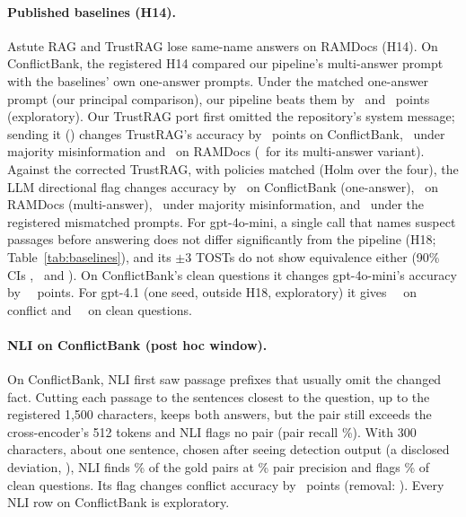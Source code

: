 \paragraph{Published baselines (H14).} Astute RAG \citep{wang2025astute} and TrustRAG \citep{zhou2025trustrag} lose same-name answers
on RAMDocs (H14). On ConflictBank, the registered H14 compared our pipeline's multi-answer prompt with the
baselines' own one-answer prompts. Under the matched one-answer prompt (our principal comparison), our pipeline beats them by
\hFourteenMatchedAst\ and \hFourteenMatchedTr\ points (exploratory). Our TrustRAG port
first omitted the repository's system message; sending it () changes TrustRAG's accuracy by \blTrustSysCb\
points on ConflictBank, \blTrustSysMj\ under majority misinformation and \blTrustSysRd\ on RAMDocs (\blTrustSysRdMulti\
for its multi-answer variant). Against the corrected TrustRAG, with policies matched (Holm over the four), the LLM
directional flag changes accuracy by \blHFourteenCbs\ on ConflictBank (one-answer), \blHFourteenRd\ on RAMDocs (multi-answer),
\blHFourteenMj\ under majority misinformation, and \blHFourteenCb\ under the registered mismatched prompts.
For gpt-4o-mini, a single call that names suspect passages before answering does not differ significantly from the
pipeline (H18; Table~\ref{tab:baselines}), and its $\pm$3 TOSTs do not show equivalence either (90\% CIs
\tostHEighteenRd, \tostHEighteenCb\ and \tostHEighteenMj). On ConflictBank's clean questions it changes
gpt-4o-mini's accuracy by \zSgMiniSelfIdentifyClean\ \zSgMiniSelfIdentifyCleanCI\ points. For gpt-4.1 (one seed,
outside H18, exploratory) it gives \zSgFourSelfIdentifyConflict\ \zSgFourSelfIdentifyConflictCI\ on conflict and
\zSgFourSelfIdentifyClean\ \zSgFourSelfIdentifyCleanCI\ on clean questions.

\paragraph{NLI on ConflictBank (post hoc window).} On ConflictBank, NLI first saw passage prefixes that usually omit
the changed fact. Cutting each passage to the sentences closest to the question, up to the registered 1,500
characters, keeps both answers, but the pair still exceeds the cross-encoder's 512 tokens and NLI flags no pair (pair
recall \detNliWinRecall\%). With 300 characters, about one sentence, chosen after seeing detection output (a
disclosed deviation, \prs{17.6}), NLI finds \detNliSentRecall\% of the gold pairs at \detNliSentPrec\% pair precision
and flags \detNliSentCleanFpr\% of clean questions. Its flag changes conflict accuracy by \blNliSentFlag\ points
(removal: \blNliSentRem). Every NLI row on ConflictBank is exploratory.

